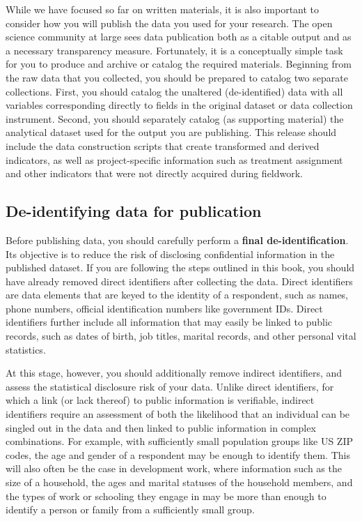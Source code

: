 While we have focused so far on written materials,
it is also important to consider how you will publish
the data you used for your research.
The open science community at large sees data publication
both as a citable output and as a necessary transparency measure.
Fortunately, it is a conceptually simple task for you to produce
and archive or catalog the required materials.
Beginning from the raw data that you collected,
you should be prepared to catalog two separate collections.
First, you should catalog the unaltered (de-identified) data
with all variables corresponding directly
to fields in the original dataset or data collection instrument.
Second, you should separately catalog (as supporting material)
the analytical dataset used for the output you are publishing.
This release should include the data construction scripts
that create transformed and derived indicators,
as well as project-specific information
such as treatment assignment and other indicators
that were not directly acquired during fieldwork.

\subsection{De-identifying data for publication}

Before publishing data,
you should carefully perform a \textbf{final de-identification}.
Its objective is to reduce the risk of disclosing confidential information in the published dataset.
If you are following the steps outlined in this book,
you should have already removed direct identifiers after collecting the data.
Direct identifiers are data elements that are keyed to the identity of a respondent,
such as names, phone numbers, official identification numbers like government IDs.
Direct identifiers further include all information that may easily be linked to public records,
such as dates of birth, job titles, marital records, and other personal vital statistics.

At this stage, however, you should additionally remove
indirect identifiers, and assess the statistical disclosure risk of your data.
Unlike direct identifiers, for which a link (or lack thereof) to public information is verifiable,
indirect identifiers require an assessment of both the likelihood
that an individual can be singled out in the data
and then linked to public information in complex combinations.
For example, with sufficiently small population groups like US ZIP codes,
the age and gender of a respondent may be enough to identify them.
This will also often be the case in development work,
where information such as the size of a household,
the ages and marital statuses of the household members,
and the types of work or schooling they engage in
may be more than enough to identify a person or family
from a sufficiently small group.

